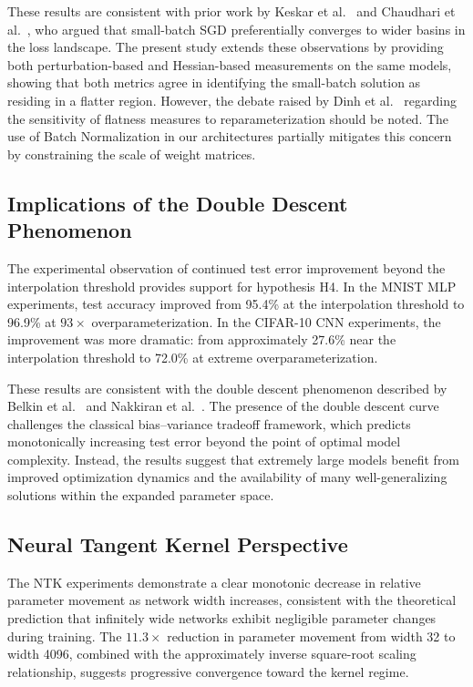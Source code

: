 \documentclass[conference]{IEEEtran}
\begin{document}
These results are consistent with prior work by Keskar et al.~\cite{keskar2017large} and Chaudhari et al.~\cite{chaudhari2017entropy}, who argued that small-batch SGD preferentially converges to wider basins in the loss landscape. The present study extends these observations by providing both perturbation-based and Hessian-based measurements on the same models, showing that both metrics agree in identifying the small-batch solution as residing in a flatter region. However, the debate raised by Dinh et al.~\cite{dinh2017sharp} regarding the sensitivity of flatness measures to reparameterization should be noted. The use of Batch Normalization in our architectures partially mitigates this concern by constraining the scale of weight matrices.

\subsection{Implications of the Double Descent Phenomenon}

The experimental observation of continued test error improvement beyond the interpolation threshold provides support for hypothesis H4. In the MNIST MLP experiments, test accuracy improved from 95.4\% at the interpolation threshold to 96.9\% at $93\times$ overparameterization. In the CIFAR-10 CNN experiments, the improvement was more dramatic: from approximately 27.6\% near the interpolation threshold to 72.0\% at extreme overparameterization.

These results are consistent with the double descent phenomenon described by Belkin et al.~\cite{belkin2019reconciling} and Nakkiran et al.~\cite{nakkiran2020deep}. The presence of the double descent curve challenges the classical bias--variance tradeoff framework, which predicts monotonically increasing test error beyond the point of optimal model complexity. Instead, the results suggest that extremely large models benefit from improved optimization dynamics and the availability of many well-generalizing solutions within the expanded parameter space.

\subsection{Neural Tangent Kernel Perspective}

The NTK experiments demonstrate a clear monotonic decrease in relative parameter movement as network width increases, consistent with the theoretical prediction that infinitely wide networks exhibit negligible parameter changes during training. The $11.3\times$ reduction in parameter movement from width 32 to width 4096, combined with the approximately inverse square-root scaling relationship, suggests progressive convergence toward the kernel regime.
\end{document}
